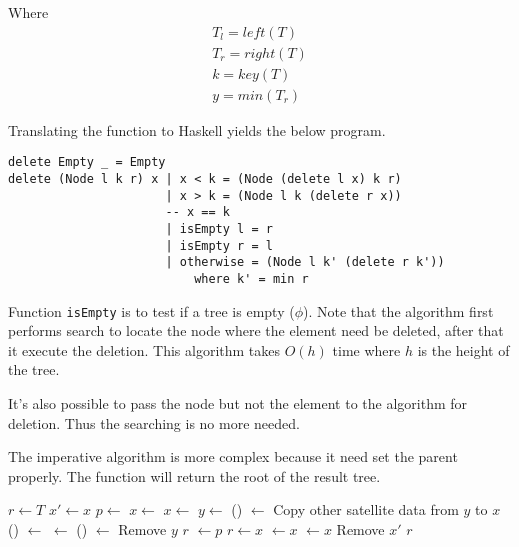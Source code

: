\documentclass{article}
\begin{document}
Where
\[
\begin{array}{l}
T_l = left(T) \\
T_r = right(T) \\
k = key(T) \\
y = min(T_r)
\end{array}
\]

Translating the function to Haskell yields the below program.

\lstset{language=Haskell}
\begin{lstlisting}
delete Empty _ = Empty
delete (Node l k r) x | x < k = (Node (delete l x) k r)
                      | x > k = (Node l k (delete r x))
                      -- x == k
                      | isEmpty l = r
                      | isEmpty r = l
                      | otherwise = (Node l k' (delete r k'))
                          where k' = min r
\end{lstlisting}

Function \texttt{isEmpty} is to test if a tree is empty ($\phi$).
Note that the algorithm first performs search to locate the node
where the element need be deleted, after that it execute the
deletion. This algorithm takes $O(h)$ time where $h$ is the height
of the tree.

It's also possible to pass the node but not the element to the
algorithm for deletion. Thus the searching is no more needed.

The imperative algorithm is more complex because it need set the
parent properly. The function will return the root of the result tree.

\begin{algorithmic}[1]
  \State $r \gets T$
  \State $x' \gets x$ 
  \State $p \gets $ 
    \State $x \gets $ 
    \State $x \gets $ 
  \Else
    \State  $y \gets $ ()
    \State {} $\gets$ 
    \State Copy other satellite data from $y$ to $x$
      \State {}() $\gets$ 
    \Else
      \State {} $\gets$ 
    \EndIf
      \State {}() $\gets$ 
    \EndIf
    \State Remove $y$
    \State \Return $r$
  \EndIf
    \State {} $\gets p$
  \EndIf
    \State $r \gets x$
  \Else
      \State {} $\gets x$
    \Else
      \State {} $\gets x$
    \EndIf
  \EndIf
  \State Remove $x'$
  \State \Return $r$
\EndFunction
\end{algorithmic}
\end{document}
